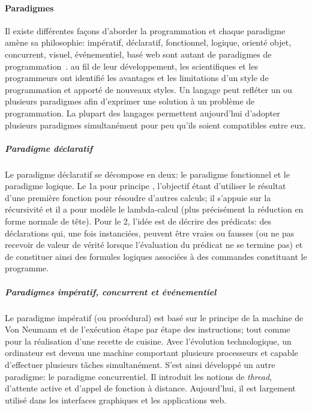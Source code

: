         \paragraph{Paradigmes}
            Il existe différentes façons d'aborder la programmation et chaque paradigme amène sa philosophie: impératif, déclaratif, fonctionnel, logique, orienté objet, concurrent, visuel, événementiel, basé web sont autant de paradigmes de programmation~. au fil de leur développement, les scientifiques et les programmeurs ont identifié les avantages et les limitations d'un style de programmation et apporté de nouveaux styles.
            Un langage peut refléter un ou plusieurs paradigmes afin d'exprimer une solution à un problème de programmation. La plupart des langages permettent aujourd'hui d'adopter plusieurs paradigmes simultanément pour peu qu'ils soient compatibles entre eux.
            \subparagraph{Paradigme déclaratif}
                Le paradigme déclaratif se décompose en deux: le paradigme fonctionnel et le paradigme logique. Le 1\ier a pour principe , l'objectif étant d'utiliser le résultat d'une première fonction pour résoudre d'autres calculs; il s'appuie sur la récursivité et il a pour modèle le lambda-calcul (plus précisément la réduction en forme normale de tête). %
                Pour le 2\nd, l'idée est de décrire des prédicats: \cad des déclarations qui, une fois instanciées, peuvent être vraies ou fausses (ou ne pas recevoir de valeur de vérité lorsque l'évaluation du prédicat ne se termine pas) et de constituer ainsi des formules logiques associées à des commandes constituant le programme.
            \subparagraph{Paradigmes impératif, concurrent et événementiel}
                Le paradigme impératif (ou procédural) est basé sur le principe de la machine de Von Neumann et de l'exécution étape par étape des instructions; tout comme pour la réalisation d'une recette de cuisine. %
                Avec l'évolution technologique, un ordinateur est devenu une machine comportant plusieurs processeurs et capable d'effectuer plusieurs tâches simultanément. S'est ainsi développé un autre paradigme: le paradigme concurrentiel. Il introduit les notions de \textit{thread}, d'attente active et d'appel de fonction à distance. Aujourd'hui, il est largement utilisé dans les interfaces graphiques et les applications web.
